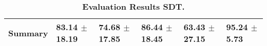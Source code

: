 \begin{table}[htb]
{\begin{tabular}{llllll}
\midrule
\textbf{Summary                                  } &                  \phantom{0}83.14 $\pm$ 18.19 &                      \phantom{0}74.68 $\pm$ 17.85 &                  \phantom{0}86.44 $\pm$ 18.45 &                  \phantom{0}63.43 $\pm$ 27.15 &  \phantom{0}95.24 $\pm$ \phantom{0}5.73 \\
\bottomrule
\end{tabular}%
}
\caption{\textbf{Evaluation Results SDT.}}
\label{tab:eval-results}
\end{table}
\newpage 

